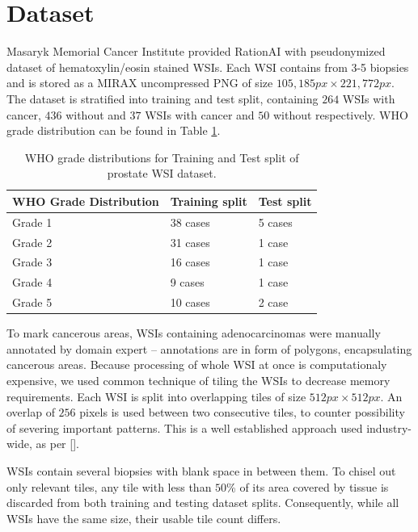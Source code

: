 \section{Dataset}

Masaryk Memorial Cancer Institute provided RationAI with pseudonymized dataset of hematoxylin/eosin stained WSIs.
Each WSI contains from 3-5 biopsies and is stored as a MIRAX uncompressed PNG of size $105,185 px \times 221,772 px$.
The dataset is stratified into training and test split, containing $264$ WSIs with cancer, $436$ without and $37$ WSIs with cancer and $50$ without respectively.
WHO grade distribution can be found in Table \ref{tab:who_grade_distribution}.

\begin{table}
\centering
{}
\begin{tabular}{@{}lll@{}}\toprule
WHO Grade Distribution & Training split & Test split \\ 
\midrule
Grade 1         & 38 cases            & 5 cases      \\
Grade 2         & 31 cases            & 1 case       \\
Grade 3         & 16 cases            & 1 case       \\
Grade 4         & 9 cases             & 1 case       \\
Grade 5         & 10 cases            & 2 case       \\
\bottomrule
\end{tabular}
\caption{WHO grade distributions for Training and Test split of prostate WSI dataset.}
\label{tab:who_grade_distribution}
\end{table}

To mark cancerous areas, WSIs containing adenocarcinomas were manually annotated by domain expert -- annotations are in form of polygons, encapsulating cancerous areas.
Because processing of whole WSI at once is computationaly expensive, we used common technique of tiling the WSIs to decrease memory requirements.
Each WSI is split into overlapping tiles of size $512px \times 512px$.
An overlap of $256$ pixels is used between two consecutive tiles, to counter possibility of severing important patterns.
This is a well established approach used industry-wide, as per [].

WSIs contain several biopsies with blank space in between them.
To chisel out only relevant tiles, any tile with less than $50$\% of its area covered by tissue is discarded from both training and testing dataset splits.
Consequently, while all WSIs have the same size, their usable tile count differs.


